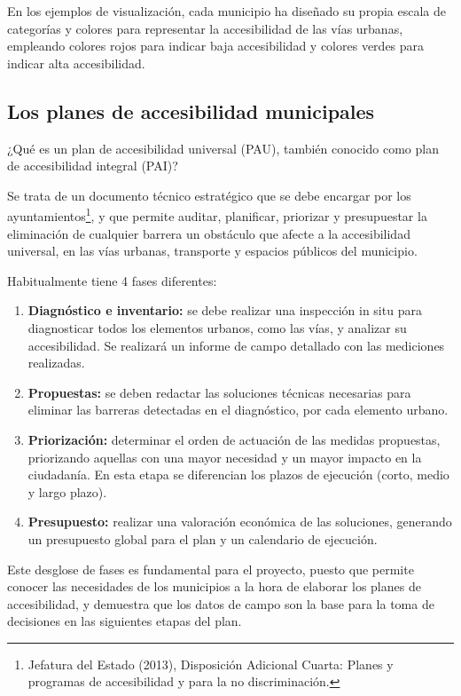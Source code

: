 En los ejemplos de visualización, cada municipio ha diseñado su propia escala de categorías y colores para representar la accesibilidad de las vías urbanas, empleando colores rojos para indicar baja accesibilidad y colores verdes para indicar alta accesibilidad.

\subsection{Los planes de accesibilidad municipales}
¿Qué es un plan de accesibilidad universal (PAU), también conocido como plan de accesibilidad integral (PAI)?

Se trata de un documento técnico estratégico que se debe encargar por los ayuntamientos\footnote{Jefatura del Estado (2013), Disposición Adicional Cuarta: Planes y programas de accesibilidad y para la no discriminación.}, y que permite auditar, planificar, priorizar y presupuestar la eliminación de cualquier barrera un obstáculo que afecte a la accesibilidad universal, en las vías urbanas, transporte y espacios públicos del municipio.

Habitualmente tiene 4 fases diferentes:
\begin{enumerate}
    \item \textbf{Diagnóstico e inventario:} se debe realizar una inspección in situ para diagnosticar todos los elementos urbanos, como las vías, y analizar su accesibilidad. Se realizará un informe de campo detallado con las mediciones realizadas.
    \item \textbf{Propuestas:} se deben redactar las soluciones técnicas necesarias para eliminar las barreras detectadas en el diagnóstico, por cada elemento urbano.
    \item \textbf{Priorización:} determinar el orden de actuación de las medidas propuestas, priorizando aquellas con una mayor necesidad y un mayor impacto en la ciudadanía. En esta etapa se diferencian los plazos de ejecución (corto, medio y largo plazo).
    \item \textbf{Presupuesto:} realizar una valoración económica de las soluciones, generando un presupuesto global para el plan y un calendario de ejecución.
\end{enumerate}

Este desglose de fases es fundamental para el proyecto, puesto que permite conocer las necesidades de los municipios a la hora de elaborar los planes de accesibilidad, y demuestra que los datos de campo son la base para la toma de decisiones en las siguientes etapas del plan.
\\

